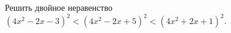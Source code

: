 \begin{ex}
	\begin{condition}
		Решить двойное неравенство  $ (4x^2 - 2x - 3)^2<(4x^2 - 2x + 5)^2<(4x^2 + 2x +1)^2  . $
	\end{condition}
\end{ex}